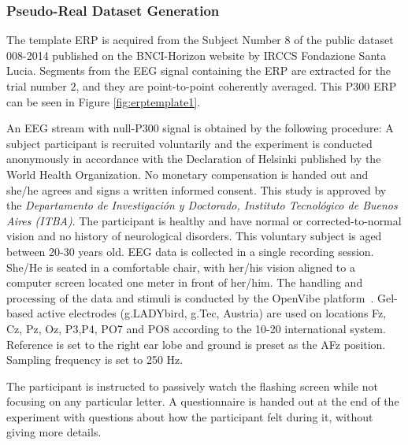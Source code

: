 \documentclass[brainsci,article,submit,moreauthors,pdftex,10pt,a4paper]{mdpi}
\begin{document}
\subsubsection{Pseudo-Real Dataset Generation}

The template ERP is acquired from the Subject Number $8$ of the public dataset 008-2014  \citep{Riccio2013} published on the BNCI-Horizon website \citep{Brunner2014} by IRCCS Fondazione Santa Lucia. Segments from the EEG signal containing the ERP are extracted for the trial number $2$, and they are point-to-point coherently averaged.  This P300 ERP can be seen in Figure  \ref{fig:erptemplate1}. 

An EEG stream with null-P300 signal is obtained by the following procedure: 
A subject participant is recruited voluntarily and the experiment is conducted anonymously in accordance with the Declaration of Helsinki published by the World Health Organization.  No monetary compensation is handed out and she/he agrees and signs a written informed consent.  This study is approved by the \textit{Departamento de Investigación y Doctorado, Instituto Tecnológico de Buenos Aires (ITBA)}.  The participant is healthy and have normal or corrected-to-normal vision and no history of neurological disorders. This voluntary subject is aged between 20-30 years old.  EEG data is collected in a single recording session. She/He is seated in a comfortable chair, with her/his vision aligned to a computer screen located one meter in front of her/him.  The handling and processing of the data and stimuli is conducted by the OpenVibe platform~\citep{Renard2010}.  Gel-based active electrodes (g.LADYbird, g.Tec, Austria) are used on locations Fz, Cz, Pz, Oz, P3,P4, PO7 and PO8 according to the 10-20 international system.  Reference is set to the right ear lobe and ground is preset as the AFz position.   Sampling frequency is set to 250 Hz.

The participant is instructed to passively watch the flashing screen while not focusing on any particular letter.  A questionnaire is handed out at the end of the experiment with questions about how the participant felt during it, without giving more details.  

\end{document}
